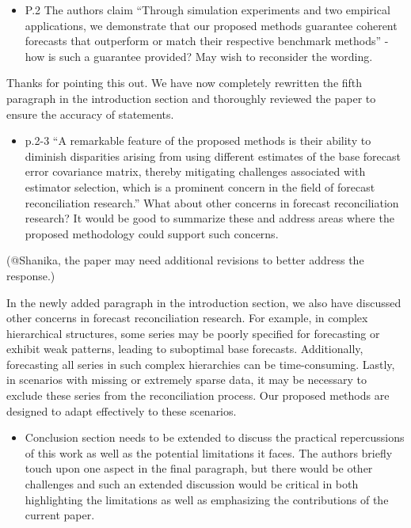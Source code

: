 \documentclass[11pt,a4paper,]{article}
\providecommand{\tightlist}{%
  \setlength{\itemsep}{0pt}\setlength{\parskip}{0pt}}
\renewenvironment{quote}
               {\list{}{\rightmargin\leftmargin}%
                \item\relax\color[RGB]{0,150,0}}
               {\endlist}
\begin{document}
\begin{itemize}
\tightlist
\item
  P.2 The authors claim ``Through simulation experiments and two
  empirical applications, we demonstrate that our proposed methods
  guarantee coherent forecasts that outperform or match their respective
  benchmark methods'' - how is such a guarantee provided? May wish to
  reconsider the wording.
\end{itemize}

\begin{quote}
Thanks for pointing this out. We have now completely rewritten the fifth
paragraph in the introduction section and thoroughly reviewed the paper
to ensure the accuracy of statements.
\end{quote}

\begin{itemize}
\tightlist
\item
  p.2-3 ``A remarkable feature of the proposed methods is their ability
  to diminish disparities arising from using different estimates of the
  base forecast error covariance matrix, thereby mitigating challenges
  associated with estimator selection, which is a prominent concern in
  the field of forecast reconciliation research.'' What about other
  concerns in forecast reconciliation research? It would be good to
  summarize these and address areas where the proposed methodology could
  support such concerns.
\end{itemize}

\begin{quote}
(@Shanika, the paper may need additional revisions to better address the
response.)

In the newly added paragraph in the introduction section, we also have
discussed other concerns in forecast reconciliation research. For
example, in complex hierarchical structures, some series may be poorly
specified for forecasting or exhibit weak patterns, leading to
suboptimal base forecasts. Additionally, forecasting all series in such
complex hierarchies can be time-consuming. Lastly, in scenarios with
missing or extremely sparse data, it may be necessary to exclude these
series from the reconciliation process. Our proposed methods are
designed to adapt effectively to these scenarios.
\end{quote}

\begin{itemize}
\tightlist
\item
  Conclusion section needs to be extended to discuss the practical
  repercussions of this work as well as the potential limitations it
  faces. The authors briefly touch upon one aspect in the final
  paragraph, but there would be other challenges and such an extended
  discussion would be critical in both highlighting the limitations as
  well as emphasizing the contributions of the current paper.
\end{itemize}
\end{document}
